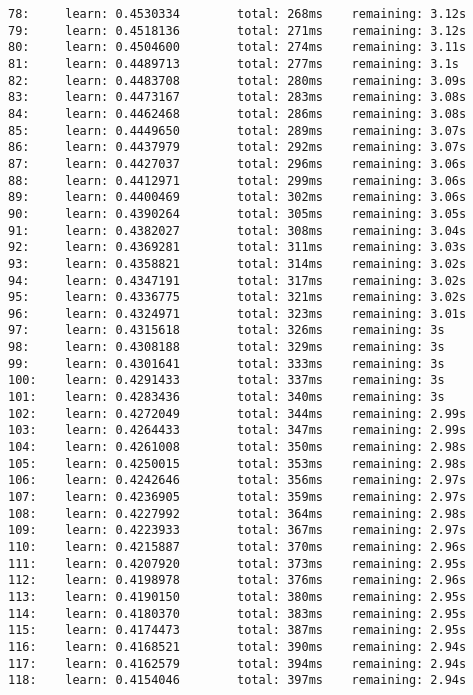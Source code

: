 \documentclass[11pt]{article}
\begin{document}
\begin{Verbatim}[commandchars=\\\{\}]
78:     learn: 0.4530334        total: 268ms    remaining: 3.12s
79:     learn: 0.4518136        total: 271ms    remaining: 3.12s
80:     learn: 0.4504600        total: 274ms    remaining: 3.11s
81:     learn: 0.4489713        total: 277ms    remaining: 3.1s
82:     learn: 0.4483708        total: 280ms    remaining: 3.09s
83:     learn: 0.4473167        total: 283ms    remaining: 3.08s
84:     learn: 0.4462468        total: 286ms    remaining: 3.08s
85:     learn: 0.4449650        total: 289ms    remaining: 3.07s
86:     learn: 0.4437979        total: 292ms    remaining: 3.07s
87:     learn: 0.4427037        total: 296ms    remaining: 3.06s
88:     learn: 0.4412971        total: 299ms    remaining: 3.06s
89:     learn: 0.4400469        total: 302ms    remaining: 3.06s
90:     learn: 0.4390264        total: 305ms    remaining: 3.05s
91:     learn: 0.4382027        total: 308ms    remaining: 3.04s
92:     learn: 0.4369281        total: 311ms    remaining: 3.03s
93:     learn: 0.4358821        total: 314ms    remaining: 3.02s
94:     learn: 0.4347191        total: 317ms    remaining: 3.02s
95:     learn: 0.4336775        total: 321ms    remaining: 3.02s
96:     learn: 0.4324971        total: 323ms    remaining: 3.01s
97:     learn: 0.4315618        total: 326ms    remaining: 3s
98:     learn: 0.4308188        total: 329ms    remaining: 3s
99:     learn: 0.4301641        total: 333ms    remaining: 3s
100:    learn: 0.4291433        total: 337ms    remaining: 3s
101:    learn: 0.4283436        total: 340ms    remaining: 3s
102:    learn: 0.4272049        total: 344ms    remaining: 2.99s
103:    learn: 0.4264433        total: 347ms    remaining: 2.99s
104:    learn: 0.4261008        total: 350ms    remaining: 2.98s
105:    learn: 0.4250015        total: 353ms    remaining: 2.98s
106:    learn: 0.4242646        total: 356ms    remaining: 2.97s
107:    learn: 0.4236905        total: 359ms    remaining: 2.97s
108:    learn: 0.4227992        total: 364ms    remaining: 2.98s
109:    learn: 0.4223933        total: 367ms    remaining: 2.97s
110:    learn: 0.4215887        total: 370ms    remaining: 2.96s
111:    learn: 0.4207920        total: 373ms    remaining: 2.95s
112:    learn: 0.4198978        total: 376ms    remaining: 2.96s
113:    learn: 0.4190150        total: 380ms    remaining: 2.95s
114:    learn: 0.4180370        total: 383ms    remaining: 2.95s
115:    learn: 0.4174473        total: 387ms    remaining: 2.95s
116:    learn: 0.4168521        total: 390ms    remaining: 2.94s
117:    learn: 0.4162579        total: 394ms    remaining: 2.94s
118:    learn: 0.4154046        total: 397ms    remaining: 2.94s

\end{Verbatim}
\end{document}
